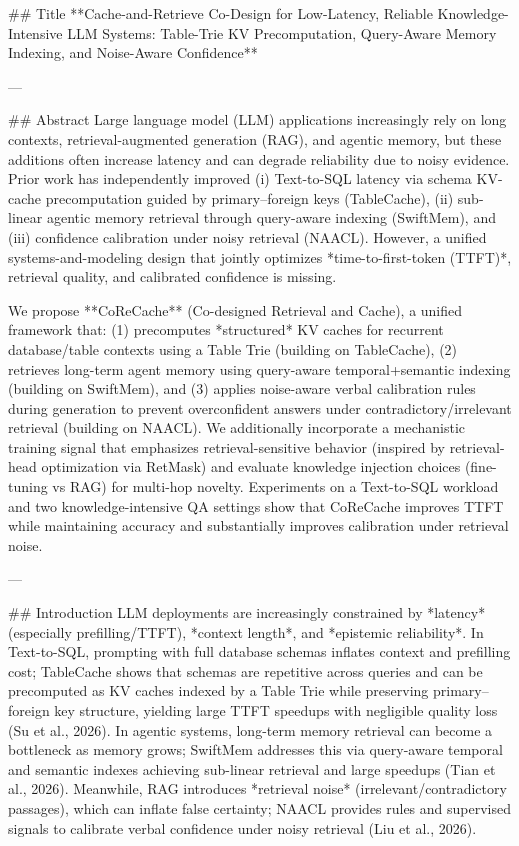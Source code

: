 ## Title  
**Cache-and-Retrieve Co-Design for Low-Latency, Reliable Knowledge-Intensive LLM Systems: Table-Trie KV Precomputation, Query-Aware Memory Indexing, and Noise-Aware Confidence**

---

## Abstract  
Large language model (LLM) applications increasingly rely on long contexts, retrieval-augmented generation (RAG), and agentic memory, but these additions often increase latency and can degrade reliability due to noisy evidence. Prior work has independently improved (i) Text-to-SQL latency via schema KV-cache precomputation guided by primary–foreign keys (TableCache), (ii) sub-linear agentic memory retrieval through query-aware indexing (SwiftMem), and (iii) confidence calibration under noisy retrieval (NAACL). However, a unified systems-and-modeling design that jointly optimizes *time-to-first-token (TTFT)*, retrieval quality, and calibrated confidence is missing.  

We propose **CoReCache** (Co-designed Retrieval and Cache), a unified framework that: (1) precomputes *structured* KV caches for recurrent database/table contexts using a Table Trie (building on TableCache), (2) retrieves long-term agent memory using query-aware temporal+semantic indexing (building on SwiftMem), and (3) applies noise-aware verbal calibration rules during generation to prevent overconfident answers under contradictory/irrelevant retrieval (building on NAACL). We additionally incorporate a mechanistic training signal that emphasizes retrieval-sensitive behavior (inspired by retrieval-head optimization via RetMask) and evaluate knowledge injection choices (fine-tuning vs RAG) for multi-hop novelty. Experiments on a Text-to-SQL workload and two knowledge-intensive QA settings show that CoReCache improves TTFT while maintaining accuracy and substantially improves calibration under retrieval noise.

---

## Introduction  
LLM deployments are increasingly constrained by *latency* (especially prefilling/TTFT), *context length*, and *epistemic reliability*. In Text-to-SQL, prompting with full database schemas inflates context and prefilling cost; TableCache shows that schemas are repetitive across queries and can be precomputed as KV caches indexed by a Table Trie while preserving primary–foreign key structure, yielding large TTFT speedups with negligible quality loss (Su et al., 2026). In agentic systems, long-term memory retrieval can become a bottleneck as memory grows; SwiftMem addresses this via query-aware temporal and semantic indexes achieving sub-linear retrieval and large speedups (Tian et al., 2026). Meanwhile, RAG introduces *retrieval noise* (irrelevant/contradictory passages), which can inflate false certainty; NAACL provides rules and supervised signals to calibrate verbal confidence under noisy retrieval (Liu et al., 2026).

